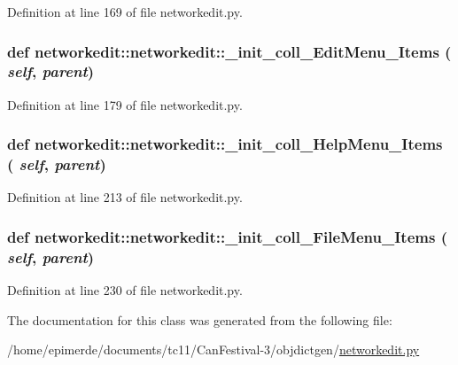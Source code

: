 Definition at line 169 of file networkedit.py.\hypertarget{classnetworkedit_1_1networkedit_25c016ab06d767eba51087786081afdc}{
\subsubsection[\_\-init\_\-coll\_\-EditMenu\_\-Items]{\setlength{\rightskip}{0pt plus 5cm}def networkedit::networkedit::\_\-init\_\-coll\_\-Edit\-Menu\_\-Items ( {\em self},  {\em parent})}}
\label{classnetworkedit_1_1networkedit_25c016ab06d767eba51087786081afdc}




Definition at line 179 of file networkedit.py.\hypertarget{classnetworkedit_1_1networkedit_eff9fade803f4b7a384ee62c83d70390}{
\subsubsection[\_\-init\_\-coll\_\-HelpMenu\_\-Items]{\setlength{\rightskip}{0pt plus 5cm}def networkedit::networkedit::\_\-init\_\-coll\_\-Help\-Menu\_\-Items ( {\em self},  {\em parent})}}
\label{classnetworkedit_1_1networkedit_eff9fade803f4b7a384ee62c83d70390}




Definition at line 213 of file networkedit.py.\hypertarget{classnetworkedit_1_1networkedit_819560a4debaf28d7a1837c1fe68212b}{
\subsubsection[\_\-init\_\-coll\_\-FileMenu\_\-Items]{\setlength{\rightskip}{0pt plus 5cm}def networkedit::networkedit::\_\-init\_\-coll\_\-File\-Menu\_\-Items ( {\em self},  {\em parent})}}
\label{classnetworkedit_1_1networkedit_819560a4debaf28d7a1837c1fe68212b}




Definition at line 230 of file networkedit.py.

The documentation for this class was generated from the following file:\begin{CompactItemize}
\item 
/home/epimerde/documents/tc11/Can\-Festival-3/objdictgen/\hyperlink{networkedit_8py}{networkedit.py}\end{CompactItemize}
